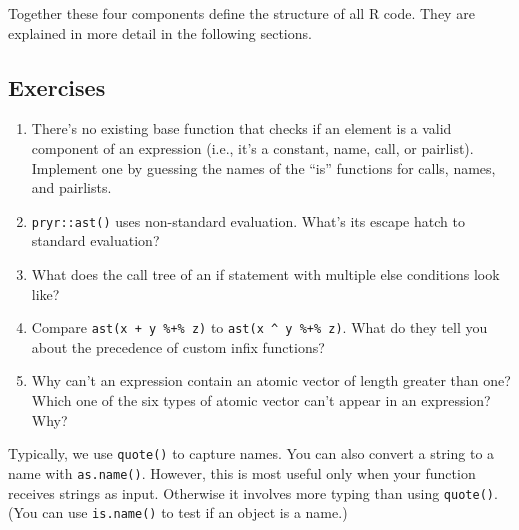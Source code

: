 \begin{Shaded}
\begin{Highlighting}[]
\StringTok{ }\NormalTok{(}\NormalTok{(} \NormalTok{(} \NormalTok{)))}
\end{Highlighting}
\end{Shaded}

Together these four components define the structure of all R code. They
are explained in more detail in the following sections.

\subsection{Exercises}

\begin{enumerate}
\def\labelenumi{\arabic{enumi}.}
\item
  There's no existing base function that checks if an element is a valid
  component of an expression (i.e., it's a constant, name, call, or
  pairlist). Implement one by guessing the names of the ``is'' functions
  for calls, names, and pairlists.
\item
  \texttt{pryr::ast()} uses non-standard evaluation. What's its escape
  hatch to standard evaluation?
\item
  What does the call tree of an if statement with multiple else
  conditions look like?
\item
  Compare \texttt{ast(x + y \%+\% z)} to \texttt{ast(x \^{} y \%+\% z)}.
  What do they tell you about the precedence of custom infix functions?
\item
  Why can't an expression contain an atomic vector of length greater
  than one? Which one of the six types of atomic vector can't appear in
  an expression? Why?
\end{enumerate}


Typically, we use \texttt{quote()} to capture names. You can also
convert a string to a name with \texttt{as.name()}. However, this is
most useful only when your function receives strings as input. Otherwise
it involves more typing than using \texttt{quote()}. (You can use
\texttt{is.name()} to test if an object is a name.) 

